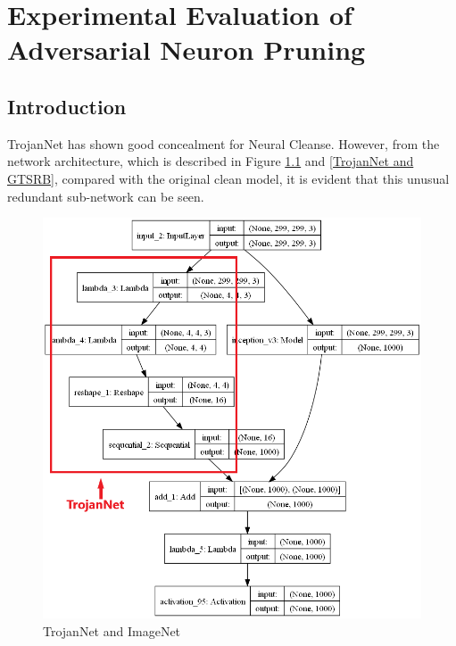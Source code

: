 \documentclass[english,version-2022-01]{uzl-thesis}
\begin{document}
\chapter{Experimental Evaluation of Adversarial Neuron Pruning} 
\label{ANP}
\section{Introduction}TrojanNet has shown good concealment for Neural Cleanse. However, from the network architecture, which is described in Figure \ref{TrojanNet and ImageNet} and \ref{TrojanNet and GTSRB}, compared with the original clean model, it is evident that this unusual redundant sub-network can be seen.
\begin{figure}[htbp]
	\centering
	\begin{minipage}{0.49\linewidth}
		\centering
		\includegraphics[width=0.9\linewidth]{pic/TrojanNet_ImageNet.png}
		\caption{TrojanNet and ImageNet}
            \label{TrojanNet and ImageNet}
	\end{minipage}
	\begin{minipage}{0.49\linewidth}
		\centering

\end{minipage}
\end{figure}
\end{document}

